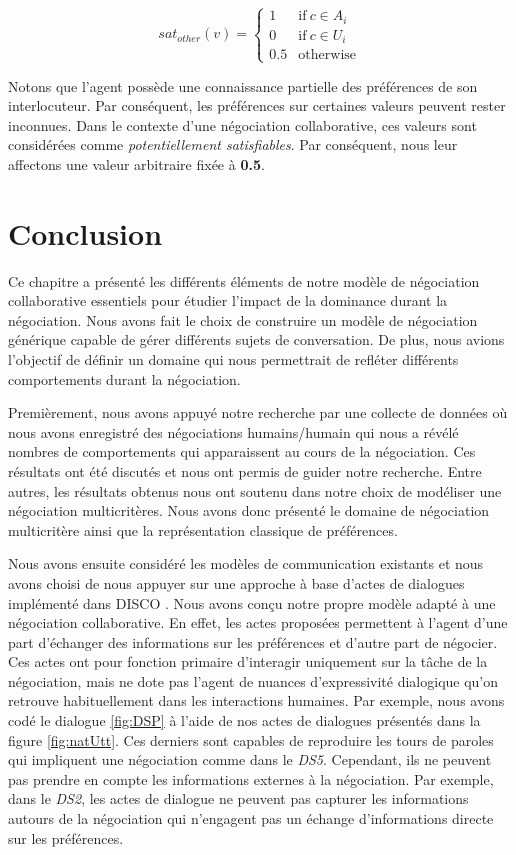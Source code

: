 \begin{equation}
sat_{other}(v)= \left\{\begin{array}{ll}
1	 & \mathrm{if\ }  c \in A_i\\
0    & \mathrm{if\ }c \in U_i\\
0.5	 & \mathrm{otherwise}
\end{array}\right.
\end{equation}

Notons que l'agent possède une connaissance partielle des préférences de son interlocuteur. Par conséquent, les préférences sur certaines valeurs peuvent rester inconnues. Dans  le contexte d'une négociation collaborative, ces valeurs sont considérées comme \textit{potentiellement satisfiables}. Par conséquent, nous leur affectons une valeur arbitraire fixée à \textbf{0.5}.

\section{Conclusion}
Ce chapitre a présenté les différents éléments de notre modèle de négociation collaborative essentiels pour étudier l'impact de la dominance durant la négociation. Nous avons fait le choix de construire un modèle de négociation générique capable de gérer différents sujets de conversation. De plus, nous avions l'objectif de définir un domaine qui nous permettrait de refléter différents comportements durant la négociation. 

Premièrement, nous avons appuyé notre recherche par une collecte de données où nous avons enregistré des négociations humains/humain qui nous a révélé nombres de comportements qui apparaissent au cours de la négociation. Ces résultats ont été discutés et nous ont permis de guider notre recherche. Entre autres, les résultats obtenus nous ont soutenu dans notre choix de modéliser une négociation  multicritères.
Nous avons donc présenté le domaine de négociation multicritère ainsi que la représentation classique de préférences.

Nous avons ensuite considéré les modèles de communication existants et nous avons choisi de nous appuyer sur une approche à base d'actes de dialogues implémenté dans DISCO \cite{rich09}. Nous avons conçu notre propre modèle adapté à une négociation collaborative. En effet, les actes proposées permettent à l'agent d'une part d'échanger des informations sur les préférences et d'autre part de négocier. Ces actes ont pour fonction primaire d'interagir uniquement sur la tâche de la négociation, mais ne dote pas l'agent de nuances d'expressivité dialogique qu'on retrouve habituellement dans les interactions humaines.
Par exemple, nous avons codé le dialogue \ref{fig:DSP} à l'aide de nos actes de dialogues présentés dans la figure \ref{fig:natUtt}. Ces derniers sont capables de reproduire les tours de paroles qui impliquent une négociation comme dans le \emph{DS5}. Cependant, ils ne peuvent pas prendre en compte les informations externes à la négociation. Par exemple, dans le \emph{DS2}, les actes de dialogue ne peuvent pas capturer les informations autours de la négociation qui n'engagent pas un échange d'informations directe sur les préférences.

